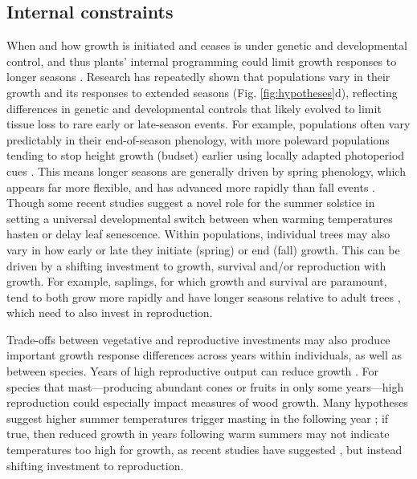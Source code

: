 \documentclass[11pt]{article}
\begin{document}
\subsection*{Internal constraints}
When and how growth is initiated and ceases is under genetic and developmental control, and thus plants' internal programming could limit growth responses to longer seasons \citep{marchand2021timing,mckown2016impacts,soolanayakanahally2013timing}. Research has repeatedly shown that populations vary in their growth and its responses to extended seasons (Fig. \ref{fig:hypotheses}d), reflecting differences in genetic and developmental controls that likely evolved to limit tissue loss to rare early or late-season events. For example, populations often vary predictably in their end-of-season phenology, with more poleward populations tending to stop height growth (budset) earlier using locally adapted photoperiod cues \citep{soolanayakanahally2013timing,aitken2016}. This means longer seasons are generally driven by spring phenology, which appears far more flexible, and has advanced more rapidly than fall events \citep{aitken2016}. Though some recent studies suggest a novel role for the summer solstice \citep{zohner2023effect} in setting a universal developmental switch between when warming temperatures hasten or delay leaf senescence. Within populations, individual trees may also vary in how early or late they initiate (spring) or end (fall) growth. This can be driven by a shifting investment to growth, survival and/or reproduction with growth. For example, saplings, for which growth and survival are paramount, tend to both grow more rapidly \citep{hilty2021plant} and have longer seasons relative to adult trees \citep{augspurger2003differences,rozendaal2010tropical,vitasse2014earlier}, which need to also invest in reproduction. %

Trade-offs between vegetative and reproductive investments may also produce important growth response differences across years within individuals, as well as between species. Years of high reproductive output can reduce growth \citep{thomas2011bookchptr,hacket2016tree}. For species that mast---producing abundant cones or fruits in only some years---high reproduction could especially impact measures of wood growth. Many hypotheses suggest higher summer temperatures trigger masting in the following year \citep{hacket2016tree,hacket2016consistent}; if true, then reduced growth in years following warm summers may not indicate temperatures too high for growth, as recent studies have suggested \citep[e.g.][]{gantois2022new,dow2022warm}, but instead shifting investment to reproduction.
\end{document}
